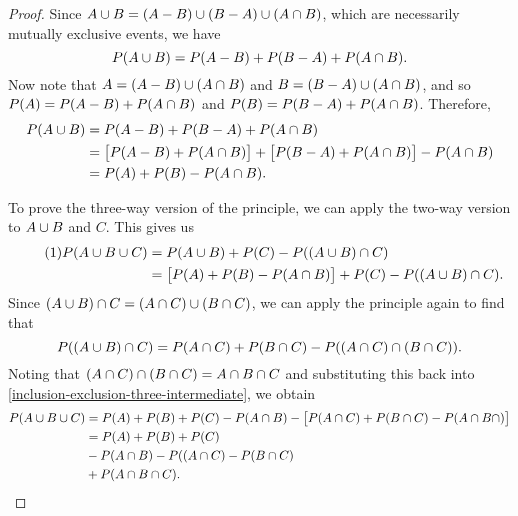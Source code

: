 \begin{proof}
    Since $A \cup B = (A - B) \cup (B - A) \cup (A \cap B)$, which are necessarily mutually exclusive events, we have
    \[P(A \cup B) = P(A - B) + P(B - A) + P(A \cap B).\]
    Now note that $A = (A - B) \cup (A \cap B)$ and $B = (B - A) \cup (A \cap B)$, and so $P(A) = P(A - B) + P(A \cap B)$ and $P(B) = P(B - A) + P(A \cap B)$. Therefore, \begin{align*}
        P(A \cup B) &= P(A - B) + P(B - A) + P(A \cap B) \\
                      &= \big[P(A - B) + P(A \cap B)\big] + \big[P(B - A) + P(A \cap B)\big] - P(A \cap B) \\
                      &= P(A) + P(B) - P(A \cap B).
    \end{align*}

    To prove the three-way version of the principle, we can apply the two-way version to $A \cup B$ and $C$. This gives us
    \begin{align*}\label{inclusion-exclusion-three-intermediate}\tag{$1$}
        P(A \cup B \cup C) &= P(A \cup B) + P(C) - P((A \cup B) \cap C) \\
        &= \big[P(A) + P(B) - P(A \cap B)\big] + P(C) - P((A \cup B) \cap C).
    \end{align*}
    Since $(A \cup B) \cap C = (A \cap C) \cup (B \cap C)$, we can apply the principle again to find that
    \[P((A \cup B) \cap C) = P(A \cap C) + P(B \cap C) - P((A \cap C) \cap (B \cap C)).\] Noting that $(A \cap C) \cap (B \cap C) = A \cap B \cap C$ and substituting this back into \ref{inclusion-exclusion-three-intermediate}, we obtain
    \begin{align*}
        P(A \cup B \cup C) &= P(A) + P(B) + P(C) - P(A \cap B) - \big[P(A \cap C) + P(B \cap C) - P(A \cap B \cap )\big] \\
        &= P(A) + P(B) + P(C) \\
        &- P(A \cap B) - P((A \cap C) - P(B \cap C) \\
        &+ P(A \cap B \cap C).
    \end{align*}
\end{proof}

